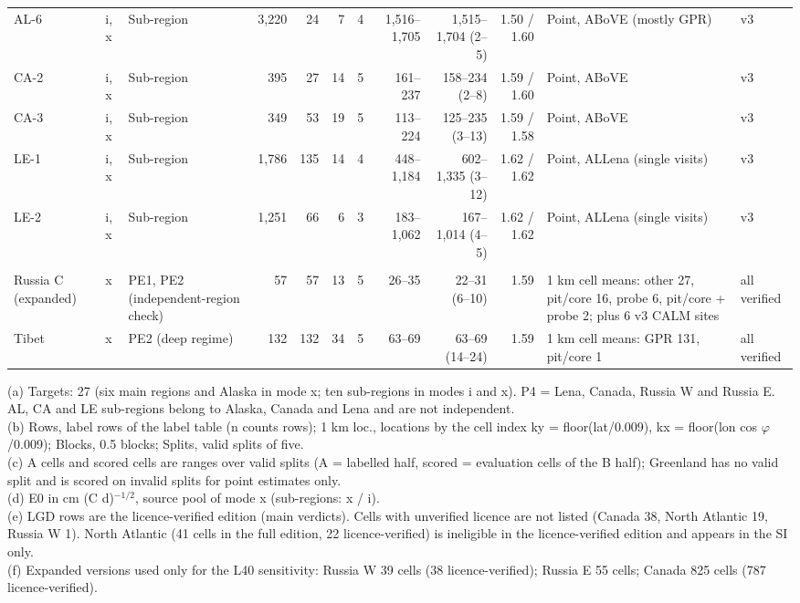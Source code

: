 \begin{table}[t]
\begin{tabular}{lllrrrrrrrll}
AL-6 & i, x & Sub-region & 3,220 & 24 & 7 & 4 & 1,516--1,705 & 1,515--1,704 (2--5) & 1.50 / 1.60 & Point, ABoVE (mostly GPR) & v3 \\
CA-2 & i, x & Sub-region & 395 & 27 & 14 & 5 & 161--237 & 158--234 (2--8) & 1.59 / 1.60 & Point, ABoVE & v3 \\
CA-3 & i, x & Sub-region & 349 & 53 & 19 & 5 & 113--224 & 125--235 (3--13) & 1.59 / 1.58 & Point, ABoVE & v3 \\
LE-1 & i, x & Sub-region & 1,786 & 135 & 14 & 4 & 448--1,184 & 602--1,335 (3--12) & 1.62 / 1.62 & Point, ALLena (single visits) & v3 \\
LE-2 & i, x & Sub-region & 1,251 & 66 & 6 & 3 & 183--1,062 & 167--1,014 (4--5) & 1.62 / 1.62 & Point, ALLena (single visits) & v3 \\
\addlinespace
\multicolumn{12}{l}{\textit{New region (LGD)}} \\
Russia C (expanded) & x & PE1, PE2 (independent-region check) & 57 & 57 & 13 & 5 & 26--35 & 22--31 (6--10) & 1.59 & 1 km cell means: other 27, pit/core 16, probe 6, pit/core + probe 2; plus 6 v3 CALM sites & all verified \\
Tibet & x & PE2 (deep regime) & 132 & 132 & 34 & 5 & 63--69 & 63--69 (14--24) & 1.59 & 1 km cell means: GPR 131, pit/core 1 & all verified \\
\bottomrule
\end{tabular}
\par\smallskip
\begin{minipage}{\textwidth}\scriptsize
(a) Targets: 27 (six main regions and Alaska in mode x; ten sub-regions in modes i and x). P4 = Lena, Canada, Russia W and Russia E. AL, CA and LE sub-regions belong to Alaska, Canada and Lena and are not independent.\\
(b) Rows, label rows of the label table (n counts rows); 1 km loc., locations by the cell index ky = floor(lat/0.009), kx = floor(lon cos $\varphi$/0.009); Blocks, 0.5\textdegree{} blocks; Splits, valid splits of five.\\
(c) A cells and scored cells are ranges over valid splits (A = labelled half, scored = evaluation cells of the B half); Greenland has no valid split and is scored on invalid splits for point estimates only.\\
(d) E0 in cm (\textdegree{}C d)$^{-1/2}$, source pool of mode x (sub-regions: x / i).\\
(e) LGD rows are the licence-verified edition (main verdicts). Cells with unverified licence are not listed (Canada 38, North Atlantic 19, Russia W 1). North Atlantic (41 cells in the full edition, 22 licence-verified) is ineligible in the licence-verified edition and appears in the SI only.\\
(f) Expanded versions used only for the L40 sensitivity: Russia W 39 cells (38 licence-verified); Russia E 55 cells; Canada 825 cells (787 licence-verified).\\
\end{minipage}
\end{table}
